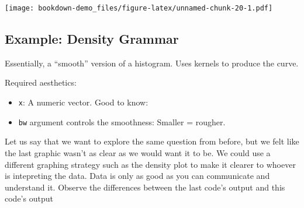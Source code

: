 \documentclass[]{book}
\newenvironment{Shaded}{\begin{snugshade}}{\end{snugshade}}
\newcommand{\KeywordTok}[1]{\textcolor[rgb]{0.13,0.29,0.53}{\textbf{#1}}}
\newcommand{\DataTypeTok}[1]{\textcolor[rgb]{0.13,0.29,0.53}{#1}}
\newcommand{\DecValTok}[1]{\textcolor[rgb]{0.00,0.00,0.81}{#1}}
\newcommand{\FloatTok}[1]{\textcolor[rgb]{0.00,0.00,0.81}{#1}}
\newcommand{\StringTok}[1]{\textcolor[rgb]{0.31,0.60,0.02}{#1}}
\newcommand{\OperatorTok}[1]{\textcolor[rgb]{0.81,0.36,0.00}{\textbf{#1}}}
\newcommand{\NormalTok}[1]{#1}
\begin{document}
\begin{Shaded}
\end{Shaded}

\texttt{[image: bookdown-demo\_files/figure-latex/unnamed-chunk-20-1.pdf]}

\subsection{Example: Density Grammar}\label{example-density-grammar}

Essentially, a ``smooth'' version of a histogram. Uses kernels to
produce the curve.

Required aesthetics:

\begin{itemize}
\item
  \texttt{x}: A numeric vector. Good to know:
\item
  \texttt{bw} argument controls the smoothness: Smaller = rougher.
\end{itemize}

Let us say that we want to explore the same question from before, but we
felt like the last graphic wasn't as clear as we would want it to be. We
could use a different graphing strategy such as the density plot to make
it clearer to whoever is intepreting the data. Data is only as good as
you can communicate and understand it. Observe the differences between
the last code's output and this code's output
\end{document}
